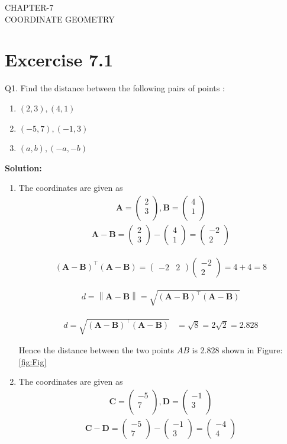 \documentclass[12pt]{article}
\providecommand{\brak}[1]{\ensuremath{\left(#1\right)}}
\providecommand{\norm}[1]{\left\lVert#1\right\rVert}
\newcommand{\solution}{\noindent \textbf{Solution: }}
\newcommand{\myvec}[1]{\ensuremath{\begin{pmatrix}#1\end{pmatrix}}}
\let\vec\mathbf
\begin{document}
\begin{center}
\textbf\large{CHAPTER-7 \\ COORDINATE GEOMETRY}
\end{center}
\section*{Excercise 7.1}

Q1. Find the distance between the following pairs of points :
\begin{enumerate}
	\item $\brak{2,3}, \brak{4,1}$ 
	\item $\brak{-5,7}, \brak{-1,3}$
	\item $\brak{a,b}, \brak{-a,-b}$
\end{enumerate}
\solution
\begin{enumerate}
\item The coordinates are given as
	\begin{align}
	\vec{A} = \myvec{
		2\\
		3\\
		},
	\vec{B} = \myvec{
		4\\
		1\\
		}
	\end{align}
	\begin{align}
		\vec{A} - \vec{B} = \myvec{2\\3} - \myvec{4\\1} = \myvec{-2\\2}		
	\end{align}
	
	
	
	\begin{align}
		(\vec{A}-\vec{B})^\top (\vec{A}-\vec{B}) = \myvec{-2&2} \myvec{-2\\2} = 4+4 = 8
	\end{align}
	
	\begin{align}
	d={\norm{\vec{A}-\vec{B}}}=\sqrt{\brak{\vec{A} -\vec{B}}^{\top}\brak{\vec{A} -\vec{B}}}
	\end{align}

\begin{align}
d=\sqrt{\brak{\vec{A} -\vec{B}}^{\top}\brak{\vec{A} -\vec{B}}}
 &=\sqrt{8}=2\sqrt{2}=2.828
\end{align}	
	
	Hence the distance between the two points $AB$ is 2.828  shown in Figure:\ref{fig:Fig}


\item The coordinates are given as
	\begin{align}
	\vec{C} = \myvec{
		-5\\
		7\\
		},
	\vec{D} = \myvec{
		-1\\
		3\\
		}
	\end{align}
	\begin{align}
		\vec{C} - \vec{D} = \myvec{-5\\7} - \myvec{-1\\3} = \myvec{-4\\4}		
	\end{align}
	

\end{enumerate}
\end{document}
